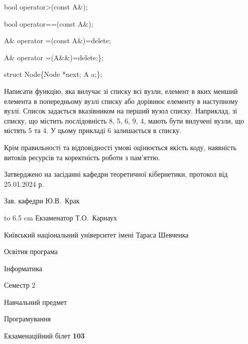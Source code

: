 \documentclass[12pt, ukrainian]{article}
\begin{document}
{\quad  bool operator>(const A\&); 

\quad  bool operator==(const A\&); 

\quad A\& operator =(const A\&)=delete; 

\quad  A\& operator =(A\&\&)=delete;\};

struct Node\{Node *next; A a;\};

 Написати функцію, яка вилучає зі списку всі вузли, елемент в яких менший елемента в попередньому вузлі списку або дорівнює елементу в наступному вузлі. Список задається вказівником на перший вузол списку. Наприклад, зі списку, що містить послідовність 8, 5, 6, 9, 4, мають бути вилучені вузли, що містять 5 та 4. У цьому прикладі 6 залишається в списку.

Крім правильності та відповідності умові оцінюється якість коду, наявність витоків ресурсів та коректність роботи з пам'яттю. 

}
{\smallskip\smallskip \begin {scriptsize} Затверджено на засіданні кафедри теоретичної кібернетики, протокол   від   25.01.2024 р.\par\smallskip\smallskip\smallskip\smallskip
{\parbox {6.5 cm} {Зав. кафедри \dotfill Ю.В.~Крак}}\hspace {0.7cm} {\hbox to 6.5 cm { Екзаменатор \dotfill Т.О.~Карнаух}} \end{scriptsize}}
\newpage
{{\begin {scriptsize}\par
{ \center  Київський національний університет імені Тараса Шевченка \par}
{\parbox {5 cm}{Освітня програма \hfill}{\parbox {7 cm}{Інформатика\hfill}}\parbox {6 cm}{\hfill Семестр 2}}\par
{\parbox {5 cm} {Навчальний предмет \hfill}\parbox {7 cm}{Програмування \hfill}\parbox {6cm}{\hfill}\par}\vspace{-15pt} \end{scriptsize}}{\center Екзаменаційний білет \No \textbf { 103 }\par}}
\end{document}
